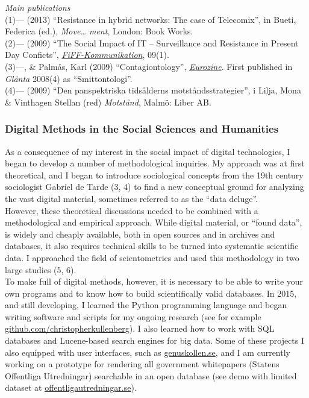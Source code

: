 \documentclass[a4paper,11pt,oneside]{article}
\begin{document}
      \noindent  \emph{Main publications} \\
      (1)--- (2013) ``Resistance in hybrid networks: The case of Telecomix'', in Bueti, Federica (ed.), \emph{Move… ment}, London: Book Works.\\
      (2)--- (2009) ``The Social Impact of IT – Surveillance and Resistance in Present Day Conficts'', \href{http://www.fiff.de/publikationen/fiff-kommunikation/fk-2009/fiff-ko-1-2009/fiko_1_2009_kullenberg.pdf}{\emph{FiFF-Kommunikation}}, 09(1).\\
      (3)---, \& Palmås, Karl (2009) ``Contagiontology'', \href{http://www.eurozine.com/articles/2009-03-09-kullenberg-en.html}{\emph{Eurozine}}. First published in \emph{Glänta} 2008(4) as ``Smittontologi''.\\
      (4)--- (2009) ``Den panspektriska tidsålderns motståndsstrategier'', i Lilja, Mona \& Vinthagen Stellan (red) \emph{Motstånd}, Malmö: Liber AB.\\


    \subsubsection{Digital Methods in the Social Sciences and Humanities}
    As a consequence of my interest in the social impact of digital technologies,
    I began to develop a number of methodological inquiries. My approach was
    at first theoretical, and I began to introduce sociological concepts from the
    19th century sociologist Gabriel de Tarde (3, 4) to find a new conceptual
    ground for analyzing the vast digital material, sometimes referred to as the
    ``data deluge''.\\

    However, these theoretical discussions needed to be combined with a methodological and
    empirical approach. While digital material, or ``found data'', is widely and cheaply
    available, both in open sources and in archives and databases, it also requires
    technical skills to be turned into systematic scientific data. I approached the
    field of scientometrics and used this methodology in two large studies (5, 6).\\

    To make full of digital methods, however, it is necessary to be able to write
    your own programs and to know how to build scientifically valid databases. In
    2015, and still developing, I learned the Python programming language and began
    writing software and scripts for my ongoing research (see for example
    \href{https://github.com/christopherkullenberg}{github.com/christopherkullenberg}).
    I also learned how to work with SQL databases and Lucene-based search engines for big data.
    Some of these projects I also equipped with user interfaces, such as
    \href{https://genuskollen.se/}{genuskollen.se}, and I am currently working
    on a prototype for rendering all government whitepapers (Statens Offentliga Utredningar)
    searchable in an open database (see demo with limited dataset at
     \href{http://offentligautredningar.se/}{offentligautredningar.se}).\\
\end{document}

